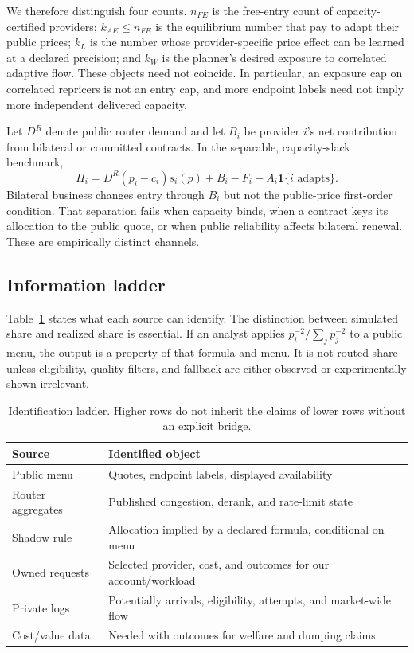 \documentclass[sigconf,nonacm]{acmart}
\newcommand{\1}{\mathbf 1}
\begin{document}
We therefore distinguish four counts.  $n_{FE}$ is the free-entry count of
capacity-certified providers; $k_{AE}\le n_{FE}$ is the equilibrium number that
pay to adapt their public prices; $k_L$ is the number whose provider-specific
price effect can be learned at a declared precision; and $k_W$ is the planner's
desired exposure to correlated adaptive flow.  These objects need not coincide.
In particular, an exposure cap on correlated repricers is not an entry cap, and
more endpoint labels need not imply more independent delivered capacity.

Let $D^R$ denote public router demand and let $B_i$ be provider $i$'s net
contribution from bilateral or committed contracts.  In the separable,
capacity-slack benchmark,
\begin{equation}
 \Pi_i=D^R(p_i-c_i)s_i(p)+B_i-F_i-A_i\1\{i\text{ adapts}\}.
 \label{eq:providerprofit}
\end{equation}
Bilateral business changes entry through $B_i$ but not the public-price
first-order condition.  That separation fails when capacity binds, when a
contract keys its allocation to the public quote, or when public reliability
affects bilateral renewal.  These are empirically distinct channels.

\subsection{Information ladder}

Table~\ref{tab:ladder} states what each source can identify.  The distinction
between simulated share and realized share is essential.  If an analyst applies
$p_i^{-2}/\sum_jp_j^{-2}$ to a public menu, the output is a property of that
formula and menu.  It is not routed share unless eligibility, quality filters,
and fallback are either observed or experimentally shown irrelevant.

\begin{table}
\caption{Identification ladder.  Higher rows do not inherit the claims of lower
rows without an explicit bridge.}
\label{tab:ladder}
\small
\begin{tabular}{p{}p{}}
\toprule
Source & Identified object \\
\midrule
Public menu & Quotes, endpoint labels, displayed availability \\
Router aggregates & Published congestion, derank, and rate-limit state \\
Shadow rule & Allocation implied by a declared formula, conditional on menu \\
Owned requests & Selected provider, cost, and outcomes for our account/workload \\
Private logs & Potentially arrivals, eligibility, attempts, and market-wide flow \\
Cost/value data & Needed with outcomes for welfare and dumping claims \\
\bottomrule
\end{tabular}
\end{table}
\end{document}
